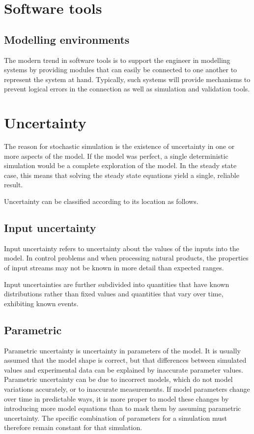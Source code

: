 
\section{Software tools}
\subsection{Modelling environments}
The modern trend in software tools is to support the engineer in modelling systems by providing modules that can easily be connected to one another to represent the system at hand.
Typically, such systems will provide mechanisms to prevent logical errors in the connection as well as simulation and validation tools.

\section{Uncertainty}
The reason for stochastic simulation is the existence of uncertainty in one or more aspects of the model.  
If the model was perfect, a single deterministic simulation would be a complete exploration of the model.  
In the steady state case, this means that solving the steady state equations yield a single, reliable result.  

Uncertainty can be classified according to its location as follows.

\subsection{Input uncertainty}
Input uncertainty refers to uncertainty about the values of the inputs into the model.  
In control problems and when processing natural products, the properties of input streams may not be known in more detail than expected ranges.

Input uncertainties are further subdivided into quantities that have known distributions rather than fixed values and quantities that vary over time, exhibiting known events.


\subsection{Parametric}
Parametric uncertainty is uncertainty in parameters of the model.  
It is usually assumed that the model shape is correct, but that differences between simulated values and experimental data can be explained by inaccurate parameter values.  
Parametric uncertainty can be due to incorrect models, which do not model variations accurately, or to inaccurate measurements.  
If model parameters change over time in predictable ways, it is more proper to model these changes by introducing more model equations than to mask them by assuming parametric uncertainty.  
The specific combination of parameters for a simulation must therefore remain constant for that simulation.

